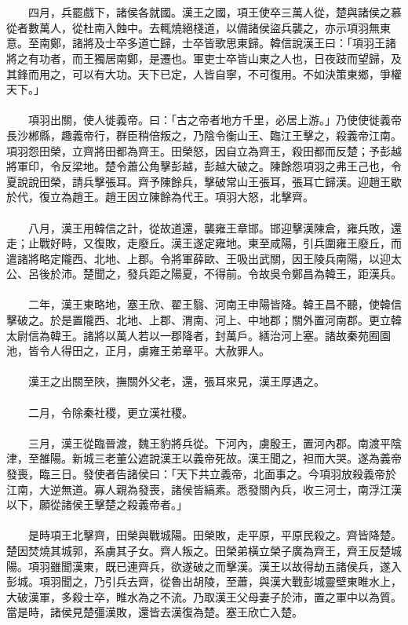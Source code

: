 \\\\
　　四月，兵罷戲下，諸侯各就國。漢王之國，項王使卒三萬人從，楚與諸侯之慕從者數萬人，從杜南入蝕中。去輒燒絕棧道，以備諸侯盜兵襲之，亦示項羽無東意。至南鄭，諸將及士卒多道亡歸，士卒皆歌思東歸。韓信說漢王曰：「項羽王諸將之有功者，而王獨居南鄭，是遷也。軍吏士卒皆山東之人也，日夜跂而望歸，及其鋒而用之，可以有大功。天下已定，人皆自寧，不可復用。不如決策東鄉，爭權天下。」
\\\\
　　項羽出關，使人徙義帝。曰：「古之帝者地方千里，必居上游。」乃使使徙義帝長沙郴縣，趣義帝行，群臣稍倍叛之，乃陰令衡山王、臨江王擊之，殺義帝江南。項羽怨田榮，立齊將田都為齊王。田榮怒，因自立為齊王，殺田都而反楚；予彭越將軍印，令反梁地。楚令蕭公角擊彭越，彭越大破之。陳餘怨項羽之弗王己也，令夏說說田榮，請兵擊張耳。齊予陳餘兵，擊破常山王張耳，張耳亡歸漢。迎趙王歇於代，復立為趙王。趙王因立陳餘為代王。項羽大怒，北擊齊。
\\\\
　　八月，漢王用韓信之計，從故道還，襲雍王章邯。邯迎擊漢陳倉，雍兵敗，還走；止戰好畤，又復敗，走廢丘。漢王遂定雍地。東至咸陽，引兵圍雍王廢丘，而遣諸將略定隴西、北地、上郡。令將軍薛歐、王吸出武關，因王陵兵南陽，以迎太公、呂後於沛。楚聞之，發兵距之陽夏，不得前。令故吳令鄭昌為韓王，距漢兵。
\\\\
　　二年，漢王東略地，塞王欣、翟王翳、河南王申陽皆降。韓王昌不聽，使韓信擊破之。於是置隴西、北地、上郡、渭南、河上、中地郡；關外置河南郡。更立韓太尉信為韓王。諸將以萬人若以一郡降者，封萬戶。繕治河上塞。諸故秦苑囿園池，皆令人得田之，正月，虜雍王弟章平。大赦罪人。
\\\\
　　漢王之出關至陜，撫關外父老，還，張耳來見，漢王厚遇之。
\\\\
　　二月，令除秦社稷，更立漢社稷。
\\\\
　　三月，漢王從臨晉渡，魏王豹將兵從。下河內，虜殷王，置河內郡。南渡平陰津，至雒陽。新城三老董公遮說漢王以義帝死故。漢王聞之，袒而大哭。遂為義帝發喪，臨三日。發使者告諸侯曰：「天下共立義帝，北面事之。今項羽放殺義帝於江南，大逆無道。寡人親為發喪，諸侯皆縞素。悉發關內兵，收三河士，南浮江漢以下，願從諸侯王擊楚之殺義帝者。」
\\\\
　　是時項王北擊齊，田榮與戰城陽。田榮敗，走平原，平原民殺之。齊皆降楚。楚因焚燒其城郭，系虜其子女。齊人叛之。田榮弟橫立榮子廣為齊王，齊王反楚城陽。項羽雖聞漢東，既已連齊兵，欲遂破之而擊漢。漢王以故得劫五諸侯兵，遂入彭城。項羽聞之，乃引兵去齊，從魯出胡陵，至蕭，與漢大戰彭城靈壁東睢水上，大破漢軍，多殺士卒，睢水為之不流。乃取漢王父母妻子於沛，置之軍中以為質。當是時，諸侯見楚彊漢敗，還皆去漢復為楚。塞王欣亡入楚。
